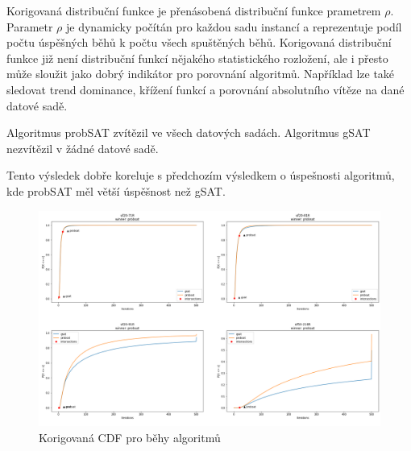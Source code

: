\documentclass[twoside,twocolumn]{article}
\begin{document}
    Korigovaná distribuční funkce je přenásobená distribuční funkce prametrem $\rho$.
    Parametr $\rho$ je dynamicky počítán pro každou sadu instancí a reprezentuje podíl počtu úspěšných běhů k počtu všech spuštěných běhů.
    Korigovaná distribuční funkce již není distribuční funkcí nějakého statistického rozložení, ale i přesto může sloužit jako
    dobrý indikátor pro porovnání algoritmů.
    Například lze také sledovat trend dominance, křížení funkcí a porovnání absolutního vítěze na dané datové sadě.

    Algoritmus probSAT zvítězil ve všech datových sadách.
    Algoritmus gSAT nezvítězil v žádné datové sadě.

    Tento výsledek dobře koreluje s předchozím výsledkem o úspešnosti algoritmů, kde probSAT měl větší úspěšnost než gSAT.

    \begin{figure}[h]
        \includegraphics[width=\textwidth]{images/gsat_probsat_revcdf-1}
        \caption{Korigovaná CDF pro běhy algoritmů}
        \label{fig:revcdf1}
    \end{figure}
\end{document}
